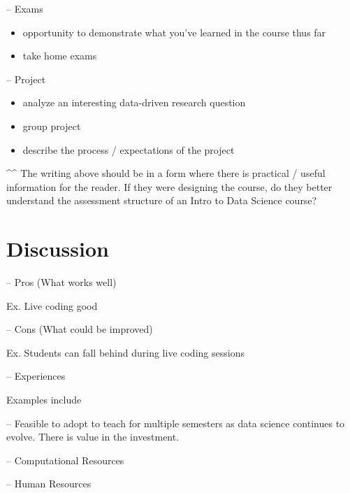 \documentclass[
  12pt]{article}
\begin{document}
-- Exams

\begin{itemize}
\item
  opportunity to demonstrate what you've learned in the course thus far
\item
  take home exams
\end{itemize}

-- Project

\begin{itemize}
\item
  analyze an interesting data-driven research question
\item
  group project
\item
  describe the process / expectations of the project
\end{itemize}

\^{}\^{} The writing above should be in a form where there is practical
/ useful information for the reader. If they were designing the course,
do they better understand the assessment structure of an Intro to Data
Science course?

\hypertarget{discussion}{%
\section{Discussion}\label{discussion}}

-- Pros (What works well)

Ex. Live coding good

-- Cons (What could be improved)

Ex. Students can fall behind during live coding sessions

-- Experiences

Examples include

-- Feasible to adopt to teach for multiple semesters as data science
continues to evolve. There is value in the investment.

-- Computational Resources

-- Human Resources

\newpage


  
\end{document}
